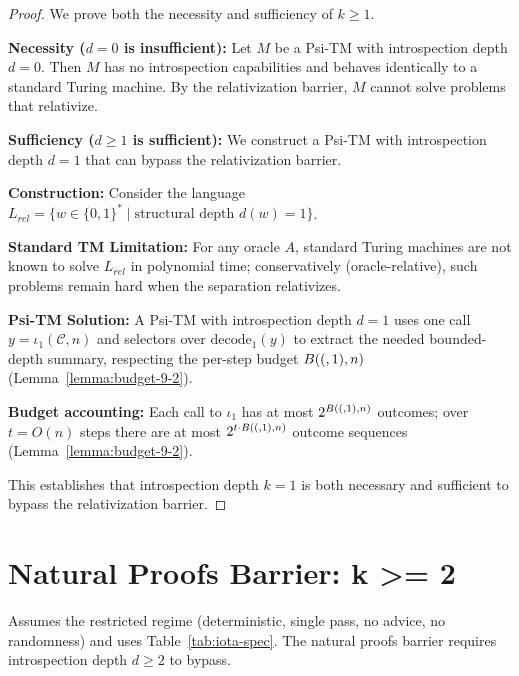 \begin{proof}
We prove both the necessity and sufficiency of $k \geq 1$.

\textbf{Necessity ($d = 0$ is insufficient):}
Let $M$ be a Psi-TM with introspection depth $d = 0$. Then $M$ has no introspection capabilities and behaves identically to a standard Turing machine. By the relativization barrier, $M$ cannot solve problems that relativize.

\textbf{Sufficiency ($d \ge 1$ is sufficient):}
We construct a Psi-TM with introspection depth $d = 1$ that can bypass the relativization barrier.

\textbf{Construction:}
Consider the language $L_{rel} = \{w \in \{0,1\}^* \mid \text{structural depth } d(w) = 1\}$.

\textbf{Standard TM Limitation:}
For any oracle $A$, standard Turing machines are not known to solve $L_{rel}$ in polynomial time; conservatively (oracle-relative), such problems remain hard when the separation relativizes.

\textbf{Psi-TM Solution:}
A Psi-TM with introspection depth $d = 1$ uses one call $y=\iota_1(\mathcal{C},n)$ and selectors over $\mathrm{decode}_1(y)$ to extract the needed bounded-depth summary, respecting the per-step budget $B((,1),n)$ (Lemma~\ref{lemma:budget-9-2}).

\textbf{Budget accounting:}
Each call to $\iota_1$ has at most $2^{B((,1),n)}$ outcomes; over $t=O(n)$ steps there are at most $2^{t\cdot B((,1),n)}$ outcome sequences (Lemma~\ref{lemma:budget-9-2}).

This establishes that introspection depth $k = 1$ is both necessary and sufficient to bypass the relativization barrier.
\end{proof}

\section{Natural Proofs Barrier: k >= 2}

\begin{theorem}
Assumes the restricted regime (deterministic, single pass, no advice, no randomness) and uses Table~\ref{tab:iota-spec}.
The natural proofs barrier requires introspection depth $d \geq 2$ to bypass.
\end{theorem}

